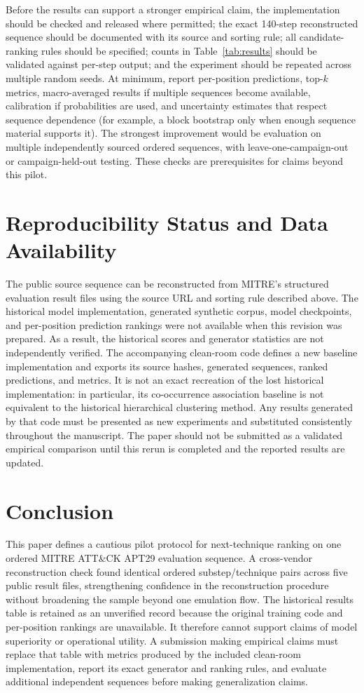 \documentclass[conference]{IEEEtran}
\begin{document}
Before the results can support a stronger empirical claim, the implementation should be checked and released where permitted; the exact 140-step reconstructed sequence should be documented with its source and sorting rule; all candidate-ranking rules should be specified; counts in Table~\ref{tab:results} should be validated against per-step output; and the experiment should be repeated across multiple random seeds. At minimum, report per-position predictions, top-$k$ metrics, macro-averaged results if multiple sequences become available, calibration if probabilities are used, and uncertainty estimates that respect sequence dependence (for example, a block bootstrap only when enough sequence material supports it). The strongest improvement would be evaluation on multiple independently sourced ordered sequences, with leave-one-campaign-out or campaign-held-out testing. These checks are prerequisites for claims beyond this pilot.

\section{Reproducibility Status and Data Availability}
The public source sequence can be reconstructed from MITRE's structured evaluation result files using the source URL and sorting rule described above. The historical model implementation, generated synthetic corpus, model checkpoints, and per-position prediction rankings were not available when this revision was prepared. As a result, the historical scores and generator statistics are not independently verified. The accompanying clean-room code defines a new baseline implementation and exports its source hashes, generated sequences, ranked predictions, and metrics. It is not an exact recreation of the lost historical implementation: in particular, its co-occurrence association baseline is not equivalent to the historical hierarchical clustering method. Any results generated by that code must be presented as new experiments and substituted consistently throughout the manuscript. The paper should not be submitted as a validated empirical comparison until this rerun is completed and the reported results are updated.

\section{Conclusion}
This paper defines a cautious pilot protocol for next-technique ranking on one ordered MITRE ATT\&CK APT29 evaluation sequence. A cross-vendor reconstruction check found identical ordered substep/technique pairs across five public result files, strengthening confidence in the reconstruction procedure without broadening the sample beyond one emulation flow. The historical results table is retained as an unverified record because the original training code and per-position rankings are unavailable. It therefore cannot support claims of model superiority or operational utility. A submission making empirical claims must replace that table with metrics produced by the included clean-room implementation, report its exact generator and ranking rules, and evaluate additional independent sequences before making generalization claims.
\end{document}
